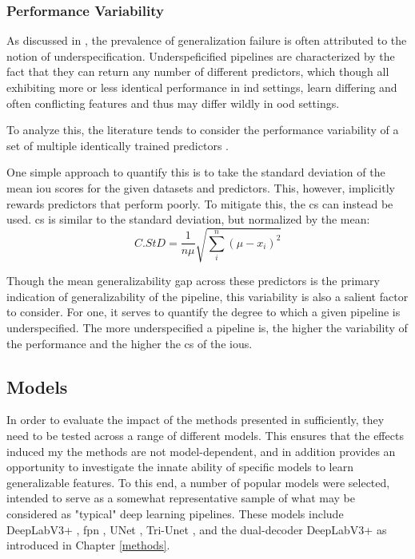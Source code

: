 
    
    \subsubsection{Performance Variability}
    As discussed in , the prevalence of generalization failure is often attributed to the notion of underspecification. Underspeficified pipelines are characterized by the fact that they can return any number of different predictors, which though all exhibiting more or less identical performance in \gls{ind} settings, learn differing and often conflicting features and thus may differ wildly in \gls{ood} settings. 
    
    To analyze this, the literature tends to consider the performance variability of a set of multiple identically trained predictors \cite{damour2020underspecification}.  
    
    One simple approach to quantify this is to take the standard deviation of the mean \gls{iou} scores for the given datasets and predictors. This, however, implicitly rewards predictors that perform poorly. To mitigate this, the \gls{cs} can instead be used. \gls{cs} is similar to the standard deviation, but normalized by the mean:
    \begin{equation}
        C.StD = \frac{1}{n \mu} \sqrt{ \sum_i^n (\mu - x_i)^2  }
    \end{equation}
    
     Though the mean generalizability gap across these predictors is the primary indication of generalizability of the pipeline, this variability is also a salient factor to consider. For one, it serves to quantify the degree to which a given pipeline is underspecified. The more underspecified a pipeline is, the higher the variability of the performance and the higher the \gls{cs} of the \glspl{iou}.  

\subsection{Models} \label{model_choices}
In order to evaluate the impact of the methods presented in  sufficiently, they need to be tested across a range of different models. This ensures that the effects induced my the methods are not model-dependent, and in addition provides an opportunity to investigate the innate ability of specific models to learn generalizable features. To this end, a number of popular models were selected, intended to serve as a somewhat representative sample of what may be considered as "typical" deep learning pipelines. These models include DeepLabV3+ \cite{deeplab}, \gls{fpn} \cite{fpn}, UNet \cite{unet}, Tri-Unet \cite{divergentnets}, and the dual-decoder DeepLabV3+ as introduced in Chapter \ref{methods}. 

